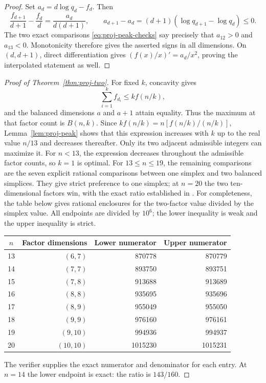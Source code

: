 \begin{proof}
Set $a_d=d\log q_d-f_d$. Then
\[
 \frac{f_{d+1}}{d+1}-\frac{f_d}{d}
    =\frac{a_d}{d(d+1)},\qquad
 a_{d+1}-a_d=(d+1)(\log q_{d+1}-\log q_d)\le0.
\]
The two exact comparisons \eqref{eq:proj-peak-checks} say precisely that
$a_{12}>0$ and $a_{13}<0$. Monotonicity therefore gives the asserted
signs in all dimensions. On $(d,d+1)$, direct differentiation gives
$(f(x)/x)'=a_d/x^2$, proving the interpolated statement as well.
\end{proof}

\begin{proof}[Proof of Theorem~\ref{thm:proj-two}]
For fixed $k$, concavity gives
\[
 \sum_{i=1}^k f_{d_i}\le k f(n/k),
\]
and the balanced dimensions $a$ and $a+1$ attain equality. Thus the
maximum at that factor count is $B(n,k)$.
Since $k f(n/k)=n[f(n/k)/(n/k)]$, Lemma~\ref{lem:proj-peak} shows
that this expression increases with $k$ up to the real value $n/13$
and decreases thereafter. Only its two adjacent admissible integers
can maximize it. For $n<13$, the expression decreases throughout the
admissible factor counts, so $k=1$ is optimal. For $13\le n\le19$, the
remaining comparisons are the seven explicit rational comparisons
between one simplex and two balanced simplices. They give strict
preference to one simplex; at $n=20$ the two ten-dimensional factors
win, with the exact ratio established in \cite{OpenAIProjection}.
For completeness, the table below gives rational enclosures for the
two-factor value divided by the simplex value. All endpoints are
divided by $10^6$; the lower inequality is weak and the upper inequality
is strict.
\begin{center}
\begin{tabular}{crrr}
\toprule
$n$ & Factor dimensions & Lower numerator & Upper numerator\\
\midrule
13 & $(6,7)$ & 870778 & 870779\\
14 & $(7,7)$ & 893750 & 893751\\
15 & $(7,8)$ & 913688 & 913689\\
16 & $(8,8)$ & 935695 & 935696\\
17 & $(8,9)$ & 955049 & 955050\\
18 & $(9,9)$ & 976160 & 976161\\
19 & $(9,10)$ & 994936 & 994937\\
20 & $(10,10)$ & 1015230 & 1015231\\
\bottomrule
\end{tabular}
\end{center}
The verifier supplies the exact numerator and denominator for each
entry. At $n=14$ the lower endpoint is exact: the ratio is $143/160$.
\end{proof}

